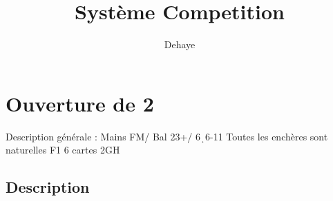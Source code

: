 \documentclass[a4paper]{article}
\title{Système Competition}
\author{Dehaye}
\begin{document}
\maketitle
\tableofcontents

\newpage

\section{Ouverture de 2\pdfc}

Description générale : Mains FM/ Bal 23+/ 6\d\ 6-11
Toutes les enchères sont naturelles F1 6 cartes 2GH

\subsection{Description}
\end{document}
